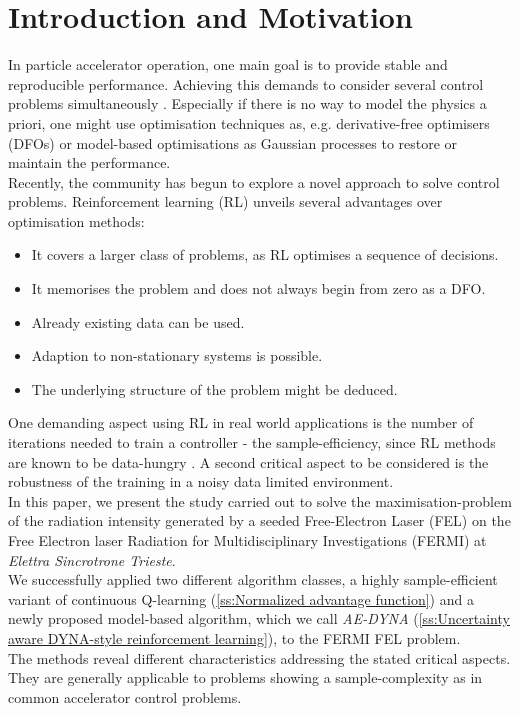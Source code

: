 \documentclass[
reprint,
amsmath,amssymb,amsfonts,clevref,
aps,
prstab,
]{revtex4-2}
\begin{document}
	\section{Introduction and Motivation}
	In particle accelerator operation, one main goal is to provide stable and reproducible performance. Achieving this demands to consider several control problems simultaneously \cite{Kain2020,Scheinker2018}. Especially if there is no way to model the physics a priori, one might use optimisation techniques as, e.g. derivative-free optimisers (DFOs) \cite{Huang2013,Bruchon2017,Scheinker2020,Hirlaender2019,Welsch2015,Albright2019} or model-based optimisations as Gaussian processes \cite{Hanuka2020,Roussel2020} to restore or maintain the performance.\\
	 Recently, the community has begun to explore a novel approach to solve control problems. Reinforcement learning (RL) \cite{Bruchon2020,Bruchon2019,Kain2020,Pang2020} unveils several advantages over optimisation methods:
	\begin{itemize}
		\item It covers a larger class of problems, as RL optimises a sequence of decisions.
		\item It memorises the problem and does not always begin from zero as a DFO.
		\item Already existing data can be used.
		\item Adaption to non-stationary systems is possible.
		\item The underlying structure of the problem might be deduced.
	\end{itemize}
	One demanding aspect using RL in real world applications is the number of iterations needed to train a controller - the sample-efficiency, since RL methods are known to be data-hungry \cite{Sutton2018,DulacArnold2019}. A second critical aspect to be considered is the robustness of the training in a noisy data limited environment.\\
	In this paper, we present the study carried out to solve the maximisation-problem of the radiation intensity generated by a seeded Free-Electron Laser (FEL) on the Free Electron laser Radiation for Multidisciplinary Investigations (FERMI) at \emph{Elettra Sincrotrone Trieste}.\\
	 We successfully applied two different algorithm classes, a highly sample-efficient variant of continuous Q-learning (\cref{ss:Normalized advantage function}) and a newly proposed 
	  model-based algorithm, which we call \emph{AE-DYNA} (\cref{ss:Uncertainty aware DYNA-style reinforcement learning}), to the FERMI FEL problem.\\ The methods reveal different characteristics addressing the stated critical aspects. They are generally applicable to problems showing a sample-complexity as in common accelerator control problems.
\end{document}
